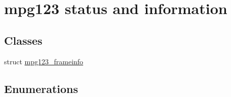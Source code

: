 \hypertarget{group__mpg123__status}{}\section{mpg123 status and information}
\label{group__mpg123__status}
\subsection*{Classes}
\begin{DoxyCompactItemize}
\item 
struct \mbox{\hyperlink{structmpg123__frameinfo}{mpg123\+\_\+frameinfo}}
\end{DoxyCompactItemize}
\subsection*{Enumerations}
